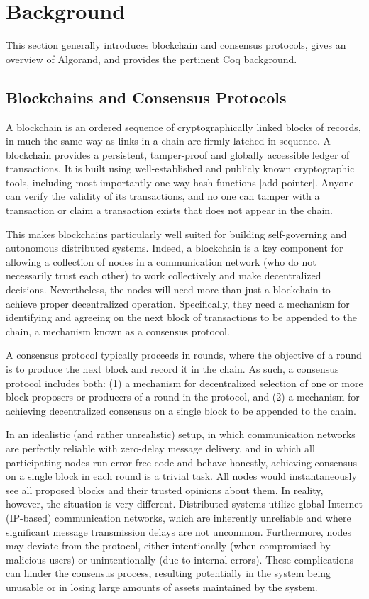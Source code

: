 \section{Background}
\label{sec:background}
This section generally introduces blockchain and consensus protocols, gives an overview of Algorand, and provides the pertinent Coq background.

\subsection{Blockchains and Consensus Protocols}

A blockchain is an ordered sequence of cryptographically linked blocks of records, in much the same way as links in a chain are firmly latched in sequence. A blockchain provides a persistent, tamper-proof and globally accessible ledger of transactions. It is built using well-established and publicly known cryptographic tools, including most importantly one-way hash functions [add pointer]. Anyone can verify the validity of its transactions, and no one can tamper with a transaction or claim a transaction exists that does not appear in the chain.

This makes blockchains particularly well suited for building self-governing and autonomous distributed systems. Indeed, a blockchain is a key component for allowing a collection of nodes in a communication network (who do not necessarily trust each other) to work collectively and make decentralized decisions. Nevertheless, the nodes will need more than just a blockchain to achieve proper decentralized operation. Specifically, they need a mechanism for identifying and agreeing on the next block of transactions to be appended to the chain, a mechanism known as a consensus protocol.

A consensus protocol typically proceeds in rounds, where the objective of a round is to produce the next block and record it in the chain. As such, a consensus protocol includes both:
(1) a mechanism for decentralized selection of one or more block proposers or producers of a round in the protocol, and 
(2) a mechanism for achieving decentralized consensus on a single block to be appended to the chain. 

In an idealistic (and rather unrealistic) setup, in which communication networks are perfectly reliable with zero-delay message delivery, and in which all participating nodes run error-free code and behave honestly, achieving consensus on a single block in each round is a trivial task. All nodes would instantaneously see all proposed blocks and their trusted opinions about them. In reality, however, the situation is very different. Distributed systems utilize global Internet (IP-based) communication networks, which are inherently unreliable and where significant message transmission delays are not uncommon. Furthermore, nodes may deviate from the protocol, either intentionally (when compromised by malicious users) or unintentionally (due to internal errors). These complications can hinder the consensus process, resulting potentially in the system being unusable or in losing large amounts of assets maintained by the system.


